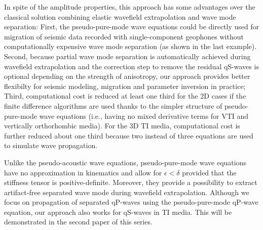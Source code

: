 In spite of the amplitude properties, this approach has some advantages over the classical solution 
combining elastic wavefield extrapolation and wave mode separation:
First, the pseudo-pure-mode wave equations could be directly used for migration of seismic data recorded
with single-component geophones without computationally expensive wave mode separation (as shown in the last example).
Second, because partial wave mode separation is automatically achieved during wavefield extrapolation and the correction step
to remove the residual qS-waves is optional depending on the strength of anisotropy,
	our approach provides better flexibilty for seismic modeling,
   migration and parameter inversion in practice;
Third, computational cost is reduced at least one third for the 2D cases
if the finite difference algorithms are used thanks to the simpler structure of pseudo-pure-mode wave equations
(i.e., having no mixed derivative terms for VTI and vertically orthorhombic media).
For the 3D TI media, computational cost is further reduced about one third because two instead of three
equations are used to simulate wave propagation.

Unlike the pseudo-acoustic wave equations, pseudo-pure-mode wave equations have no approximation in
kinematics and allow for $\epsilon<\delta$ provided that the stiffness tensor is positive-definite.
Moreover, they provide a possibility to extract artifact-free separated wave mode
during wavefield extrapolation.
Although we focus on propagation of separated qP-waves using the pseudo-pure-mode qP-wave equation,
our approach also works for qS-waves in TI media. This will be demonstrated in the second paper of this series.
